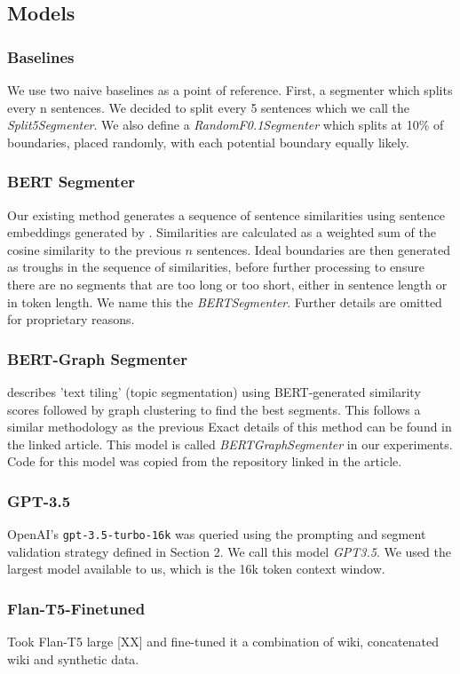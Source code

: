 \subsection{Models}

\subsubsection{Baselines}

We use two naive baselines as a point of reference. First, a segmenter which splits every n sentences. We decided to split every 5 sentences which we call the \emph{Split5Segmenter}. We also define a \emph{RandomF0.1Segmenter} which splits at 10\% of boundaries, placed randomly, with each potential boundary equally likely.

\subsubsection{BERT Segmenter}

Our existing method generates a sequence of sentence similarities using sentence embeddings generated by \cite{SentenceBERT}. Similarities are calculated as a weighted sum of the cosine similarity to the previous $n$ sentences. Ideal boundaries are then generated as troughs in the sequence of similarities, before further processing to ensure there are no segments that are too long or too short, either in sentence length or in token length. We name this the \emph{BERTSegmenter}. Further details are omitted for proprietary reasons.

\subsubsection{BERT-Graph Segmenter}

\cite{MasimilianoSegmenter} describes 'text tiling' (topic segmentation) using BERT-generated similarity scores followed by graph clustering to find the best segments. This follows a similar methodology as the previous Exact details of this method can be found in the linked article. This model is called \emph{BERTGraphSegmenter} in our experiments. Code for this model was copied from the repository linked in the article.

\subsubsection{GPT-3.5}

OpenAI's \texttt{gpt-3.5-turbo-16k} was queried using the prompting and segment validation strategy defined in Section 2. We call this model \emph{GPT3.5}. We used the largest model available to us, which is the 16k token context window.

\subsubsection{Flan-T5-Finetuned}

Took Flan-T5 large [XX] and fine-tuned it a combination of wiki, concatenated wiki and synthetic data.